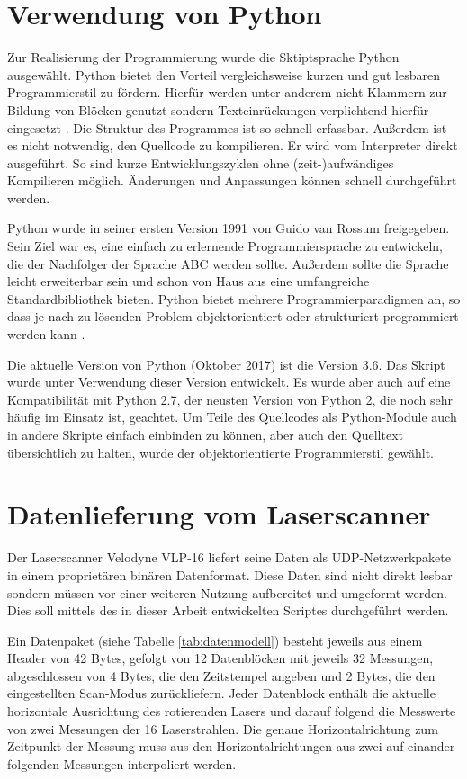 \documentclass[a4paper,12pt,bibliography=totoc, listof=totoc,titlepage]{scrreprt}
\begin{document}
\section{Verwendung von Python}
Zur Realisierung der Programmierung wurde die Sktiptsprache Python ausgewählt. Python bietet den Vorteil vergleichsweise kurzen und gut lesbaren Programmierstil zu fördern. Hierfür werden unter anderem nicht Klammern zur Bildung von Blöcken genutzt sondern Texteinrückungen verplichtend hierfür eingesetzt \citep[S. 13f]{python}. Die Struktur des Programmes ist so schnell erfassbar. Außerdem ist es nicht notwendig, den Quellcode zu kompilieren. Er wird vom Interpreter direkt ausgeführt. So sind kurze Entwicklungszyklen ohne (zeit-)aufwändiges Kompilieren möglich. Änderungen und Anpassungen können schnell durchgeführt werden.

Python wurde in seiner ersten Version 1991 von Guido van Rossum freigegeben. Sein Ziel war es, eine einfach zu erlernende Programmiersprache zu entwickeln, die der Nachfolger der Sprache ABC werden sollte. Außerdem sollte die Sprache leicht erweiterbar sein und schon von Haus aus eine umfangreiche Standardbibliothek bieten. Python bietet mehrere Programmierparadigmen an, so dass je nach zu lösenden Problem objektorientiert oder strukturiert programmiert werden kann \citep[S. 14]{python}.

Die aktuelle Version von Python (Oktober 2017) ist die Version 3.6. Das Skript wurde unter Verwendung dieser Version entwickelt. Es wurde aber auch auf eine Kompatibilität mit Python 2.7, der neusten Version von Python 2, die noch sehr häufig im Einsatz ist, geachtet. Um Teile des Quellcodes als Python-Module auch in andere Skripte einfach einbinden zu können, aber auch den Quelltext übersichtlich zu halten, wurde der objektorientierte Programmierstil gewählt.

\section{Datenlieferung vom Laserscanner}
\label{ss:Datenlieferung}
Der Laserscanner Velodyne VLP-16 liefert seine Daten als UDP-Netzwerkpakete in einem proprietären binären Datenformat. Diese Daten sind nicht direkt lesbar sondern müssen vor einer weiteren Nutzung aufbereitet und umgeformt werden. Dies soll mittels des in dieser Arbeit entwickelten Scriptes durchgeführt werden.

Ein Datenpaket (siehe Tabelle \ref{tab:datenmodell}) besteht jeweils aus einem Header von 42 Bytes, gefolgt von 12 Datenblöcken mit jeweils 32 Messungen, abgeschlossen von 4 Bytes, die den Zeitstempel angeben und 2 Bytes, die den eingestellten Scan-Modus zurückliefern. Jeder Datenblock enthält die aktuelle horizontale Ausrichtung des rotierenden Lasers und darauf folgend die Messwerte von zwei Messungen der 16 Laserstrahlen. Die genaue Horizontalrichtung zum Zeitpunkt der Messung muss aus den Horizontalrichtungen aus zwei auf einander folgenden Messungen interpoliert werden.
\end{document}
